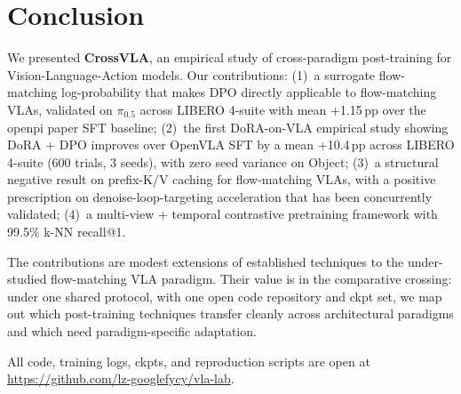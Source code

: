 \documentclass{article}
\begin{document}
\section{Conclusion}

We presented \textbf{CrossVLA}, an empirical study of cross-paradigm post-training for Vision-Language-Action models. Our contributions: (1)~a surrogate flow-matching log-probability that makes DPO directly applicable to flow-matching VLAs, validated on \(\pi_{0.5}\) across LIBERO 4-suite with mean +1.15\,pp over the openpi paper SFT baseline; (2)~the first DoRA-on-VLA empirical study showing DoRA + DPO improves over OpenVLA SFT by a mean +10.4\,pp across LIBERO 4-suite (600 trials, 3 seeds), with zero seed variance on Object; (3)~a structural negative result on prefix-K/V caching for flow-matching VLAs, with a positive prescription on denoise-loop-targeting acceleration that has been concurrently validated; (4)~a multi-view + temporal contrastive pretraining framework with 99.5\% k-NN recall@1.

The contributions are modest extensions of established techniques to the under-studied flow-matching VLA paradigm. Their value is in the comparative crossing: under one shared protocol, with one open code repository and ckpt set, we map out which post-training techniques transfer cleanly across architectural paradigms and which need paradigm-specific adaptation.

All code, training logs, ckpts, and reproduction scripts are open at \url{https://github.com/lz-googlefycy/vla-lab}.



\end{document}
